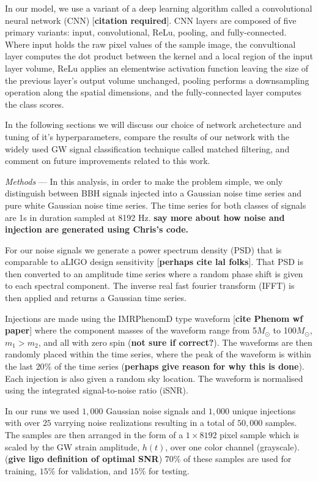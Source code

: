 \documentclass[%
 amsmath,amssymb,
 aps,
 twocolumn,
]{revtex4-1}
\begin{document}
In our model, we use a variant of a deep learning algorithm called a convolutional neural network (CNN) [\textbf{citation required}]. CNN layers are composed of five primary variants: input, convolutional, ReLu, pooling, and fully-connected. Where input holds the raw pixel values of the sample image, the convultional layer computes the dot product between the kernel and a local region of the input layer volume, ReLu applies an elementwise activation function leaving the size of the previous layer's output volume unchanged, pooling performs a downsampling operation along the spatial dimensions, and the fully-connected layer computes the class scores. 

In the following sections we will discuss our choice of network archetecture and tuning of it's hyperparameters, compare the results of our network with the widely used GW signal classification technique called matched filtering, and comment on future improvements related to this work.      

\textit{Methods} --- In this analysis, in order to make the problem simple, we only distinguish between BBH signals injected into a Gaussian noise time series and pure white Gaussian noise time series. The time series for both classes of signals are 1s in duration sampled at 8192 Hz. \textbf{say more about how noise and injection are generated using Chris's code.} 

For our noise signals we generate a power spectrum density (PSD) that is comparable to aLIGO design sensitivity [\textbf{perhaps cite lal folks}]. That PSD is then converted to an amplitude time series where a random phase shift is given to each spectral component. The inverse real fast fourier transform (IFFT) is then applied and returns a Gaussian time series.

Injections are made using the IMRPhenomD type waveform [\textbf{cite Phenom wf paper}] where the component masses of the waveform range from 5\(M_\odot\) to 100\(M_\odot\), $m_{1} > m_{2}$, and all with zero spin (\textbf{not sure if correct?}). The waveforms are then randomly placed within the time series, where the peak of the waveform is within the last $20$\% of the time series (\textbf{perhaps give reason for why this is done}). Each injection is also given a random sky location. The waveform is normalised using the integrated signal-to-noise ratio (iSNR). 

In our runs we used $1,000$ Gaussian noise signals and $1,000$ unique injections with over $25$ varrying noise realizations resulting in a total of $50,000$ samples. The samples are then arranged in the form of a $1 \times 8192$ pixel sample which is scaled by the GW strain amplitude, $h(t)$, over one color channel (grayscale). (\textbf{give ligo definition of optimal SNR}) $70\%$ of these samples are used for training, $15\%$ for validation, and $15\%$ for testing. 
\end{document}
